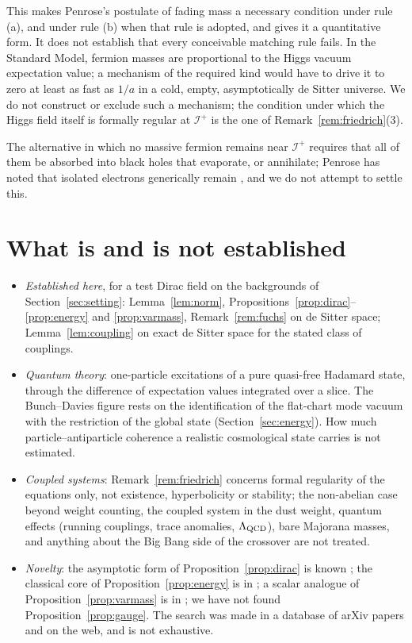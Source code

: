 \documentclass[11pt,a4paper]{article}
\theoremstyle{definition}
\newcommand{\scri}{\mathscr{I}^{+}}
\begin{document}
This makes Penrose's postulate of fading mass a necessary condition under rule (a), and under rule (b) when that rule is adopted, and gives it a quantitative form. It does not establish that every conceivable matching rule fails. In the Standard Model, fermion masses are proportional to the Higgs vacuum expectation value; a mechanism of the required kind would have to drive it to zero at least as fast as $1/a$ in a cold, empty, asymptotically de Sitter universe. We do not construct or exclude such a mechanism; the condition under which the Higgs field itself is formally regular at $\scri$ is the one of Remark~\ref{rem:friedrich}(3).

The alternative in which no massive fermion remains near $\scri$ requires that all of them be absorbed into black holes that evaporate, or annihilate; Penrose has noted that isolated electrons generically remain \cite{Penrose2010}, and we do not attempt to settle this.

\section{What is and is not established}
\label{sec:scope}

\begin{itemize}[leftmargin=1.5em]
\item \emph{Established here}, for a test Dirac field on the backgrounds of Section~\ref{sec:setting}: Lemma~\ref{lem:norm}, Propositions~\ref{prop:dirac}--\ref{prop:energy} and \ref{prop:varmass}, Remark~\ref{rem:fuchs} on de Sitter space; Lemma~\ref{lem:coupling} on exact de Sitter space for the stated class of couplings.
\item \emph{Quantum theory}: one-particle excitations of a pure quasi-free Hadamard state, through the difference of expectation values integrated over a slice. The Bunch--Davies figure rests on the identification of the flat-chart mode vacuum with the restriction of the global state (Section~\ref{sec:energy}). How much particle--antiparticle coherence a realistic cosmological state carries is not estimated.
\item \emph{Coupled systems}: Remark~\ref{rem:friedrich} concerns formal regularity of the equations only, not existence, hyperbolicity or stability; the non-abelian case beyond weight counting, the coupled system in the dust weight, quantum effects (running couplings, trace anomalies, $\Lambda_{\rm QCD}$), bare Majorana masses, and anything about the Big Bang side of the crossover are not treated.
\item \emph{Novelty}: the asymptotic form of Proposition~\ref{prop:dirac} is known \cite{DFMR2019,Ibison2011}; the classical core of Proposition~\ref{prop:energy} is in \cite{Ibison2011}; a scalar analogue of Proposition~\ref{prop:varmass} is in \cite{Bachelot2020}; we have not found Proposition~\ref{prop:gauge}. The search was made in a database of arXiv papers and on the web, and is not exhaustive.
\end{itemize}
\end{document}
